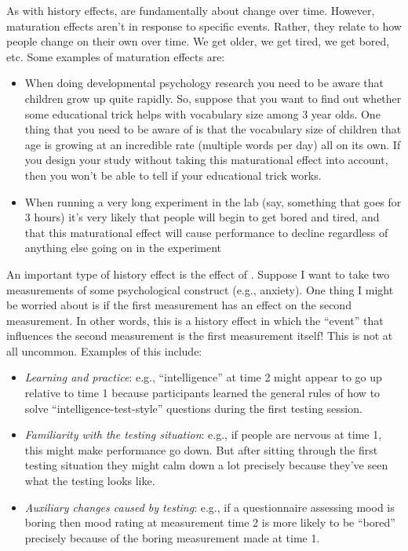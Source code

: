 
As with history effects,  are fundamentally about change over time. However, maturation effects aren't in response to specific events. Rather, they relate to how people change on their own over time. We get older, we get tired, we get bored, etc. Some examples of maturation effects are:

\begin{itemize}
\item When doing developmental psychology research you need to be aware that children grow up quite rapidly. So, suppose that you want to find out whether some educational trick helps with vocabulary size among 3 year olds. One thing that you need to be aware of is that the vocabulary size of children that age is growing at an incredible rate (multiple words per day) all on its own. If you design your study without taking this maturational effect into account, then you won't be able to tell if your educational trick works.
\item When running a very long experiment in the lab (say, something that goes for 3 hours) it's very likely that people will begin to get bored and tired, and that this maturational effect will cause performance to decline regardless of anything else going on in the experiment
\end{itemize}


An important type of history effect is the effect of . Suppose I want to take two measurements of some psychological construct (e.g., anxiety). One thing I might be worried about is if the first measurement has an effect on the second measurement. In other words, this is a history effect in which the ``event'' that influences the second measurement is the first measurement itself! This is not at all uncommon. Examples of this include:

\begin{itemize}
\item {\it Learning and practice}: e.g., ``intelligence'' at time 2 might appear to go up relative to time 1 because participants learned the general rules of how to solve ``intelligence-test-style'' questions during the first testing session.  
\item {\it Familiarity with the testing situation}: e.g., if people are nervous at time 1, this might make performance go down. But after sitting through the first testing situation they might calm down a lot precisely because they've seen what the testing looks like. 
\item {\it Auxiliary changes caused by testing}: e.g., if a questionnaire assessing mood is boring then mood rating at measurement time 2 is more likely to be ``bored'' precisely because of the boring measurement made at time 1. 
\end{itemize}

